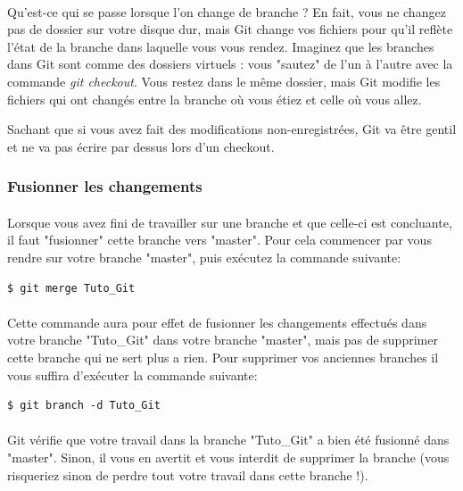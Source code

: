\documentclass[french, a4paper, 12pt, titlepage]{article}
\begin{document}
\paragraph{}Qu’est-ce qui se passe lorsque l’on change de branche ? En fait, vous ne changez pas de dossier sur votre disque dur, mais Git change vos fichiers pour qu’il reflète l’état de la branche dans laquelle vous vous rendez. Imaginez que les branches dans Git sont comme des dossiers virtuels : vous "sautez" de l’un à l’autre avec la commande \emph{git checkout}. Vous restez dans le même dossier, mais Git modifie les fichiers qui ont changés entre la branche où vous étiez et celle où vous allez.

Sachant que si vous avez fait des modifications non-enregistrées, Git va être gentil et ne va pas écrire par dessus lors d'un checkout.

\subsubsection{Fusionner les changements}
\paragraph{}Lorsque vous avez fini de travailler sur une branche et que celle-ci est concluante, il faut "fusionner" cette branche vers "master". Pour cela commencer par vous rendre sur votre branche "master", puis exécutez la commande suivante:
\begin{lstlisting}
$ git merge Tuto_Git
\end{lstlisting}

\paragraph{}Cette commande aura pour effet de fusionner les changements
effectués dans votre branche "Tuto\_Git" dans votre branche "master", mais pas
de supprimer cette branche qui ne sert plus a rien. Pour supprimer vos
anciennes branches il vous suffira d'exécuter la commande suivante:
\begin{lstlisting}
$ git branch -d Tuto_Git
\end{lstlisting}

\paragraph{}Git vérifie que votre travail dans la branche "Tuto\_Git" a bien été fusionné dans "master". Sinon, il vous en avertit et vous interdit de supprimer la branche (vous risqueriez sinon de perdre tout votre travail dans cette branche !).
\end{document}
